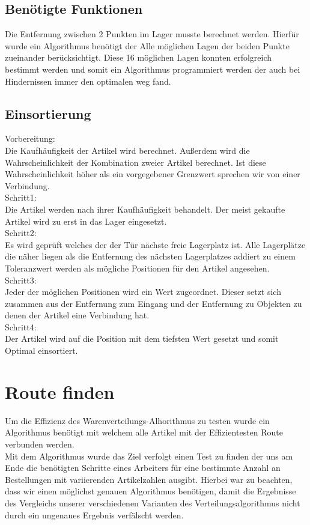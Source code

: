 \documentclass[pagenumoff]{kit-document}
\begin{document}
\subsection{Benötigte Funktionen}
Die Entfernung zwischen 2 Punkten im Lager musste berechnet werden. Hierfür wurde ein Algorithmus benötigt der Alle möglichen Lagen der beiden Punkte zueinander berücksichtigt. Diese 16 möglichen Lagen konnten erfolgreich bestimmt werden und somit ein Algorithmus programmiert werden der auch bei Hindernissen immer den optimalen weg fand.
\subsection{Einsortierung}
Vorbereitung:\\
Die Kaufhäufigkeit der Artikel wird berechnet. Außerdem wird die Wahrscheinlichkeit der Kombination zweier Artikel berechnet. Ist diese Wahrscheinlichkeit höher als ein vorgegebener Grenzwert sprechen wir von einer Verbindung. \\

Schritt1:\\
Die Artikel werden nach ihrer Kaufhäufigkeit behandelt. Der meist gekaufte Artikel wird zu erst in das Lager eingesetzt. \\
Schritt2:\\
Es wird geprüft welches der der Tür nächste freie Lagerplatz ist. Alle Lagerplätze die näher liegen als die Entfernung des nächsten Lagerplatzes addiert zu einem Toleranzwert werden als mögliche Positionen für den Artikel angesehen.\\
Schritt3:\\ 
Jeder der möglichen Positionen wird ein Wert zugeordnet. Dieser setzt sich zusammen aus der Entfernung zum Eingang und der Entfernung zu Objekten zu denen der Artikel eine Verbindung hat. \\
Schritt4:\\
Der Artikel wird auf die Position mit dem tiefsten Wert gesetzt und somit Optimal einsortiert.


\section{Route finden}
Um die Effizienz des Warenverteilungs-Alhorithmus zu testen wurde ein Algorithmus benötigt mit welchem alle Artikel mit der Effizientesten Route verbunden werden.\\ Mit dem Algorithmus wurde das Ziel verfolgt einen Test zu finden der uns am Ende die benötigten Schritte eines Arbeiters für eine bestimmte Anzahl an Bestellungen mit variierenden Artikelzahlen ausgibt. Hierbei war zu beachten, dass wir einen möglichst genauen Algorithmus benötigen, damit die Ergebnisse des Vergleichs unserer verschiedenen Varianten des Verteilungsalgorithmus nicht durch ein ungenaues Ergebnis verfälscht werden.  
\end{document}
